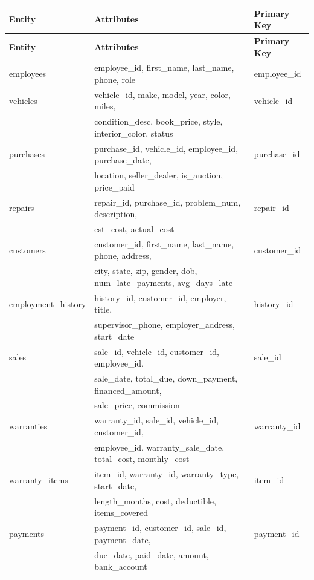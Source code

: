 \documentclass[12pt]{article}
\begin{document}
\begin{longtable}{lll}
\toprule
\textbf{Entity} & \textbf{Attributes} & \textbf{Primary Key} \\
\midrule
\endfirsthead
\toprule
\textbf{Entity} & \textbf{Attributes} & \textbf{Primary Key} \\
\midrule
\endhead
\bottomrule
\endfoot
employees & employee\_id, first\_name, last\_name, phone, role & employee\_id \\[3pt]
vehicles & vehicle\_id, make, model, year, color, miles, & vehicle\_id \\
 & condition\_desc, book\_price, style, interior\_color, status & \\[3pt]
purchases & purchase\_id, vehicle\_id, employee\_id, purchase\_date, & purchase\_id \\
 & location, seller\_dealer, is\_auction, price\_paid & \\[3pt]
repairs & repair\_id, purchase\_id, problem\_num, description, & repair\_id \\
 & est\_cost, actual\_cost & \\[3pt]
customers & customer\_id, first\_name, last\_name, phone, address, & customer\_id \\
 & city, state, zip, gender, dob, num\_late\_payments, avg\_days\_late & \\[3pt]
employment\_history & history\_id, customer\_id, employer, title, & history\_id \\
 & supervisor\_phone, employer\_address, start\_date & \\[3pt]
sales & sale\_id, vehicle\_id, customer\_id, employee\_id, & sale\_id \\
 & sale\_date, total\_due, down\_payment, financed\_amount, & \\
 & sale\_price, commission & \\[3pt]
warranties & warranty\_id, sale\_id, vehicle\_id, customer\_id, & warranty\_id \\
 & employee\_id, warranty\_sale\_date, total\_cost, monthly\_cost & \\[3pt]
warranty\_items & item\_id, warranty\_id, warranty\_type, start\_date, & item\_id \\
 & length\_months, cost, deductible, items\_covered & \\[3pt]
payments & payment\_id, customer\_id, sale\_id, payment\_date, & payment\_id \\
 & due\_date, paid\_date, amount, bank\_account & \\
\end{longtable}
\end{document}
